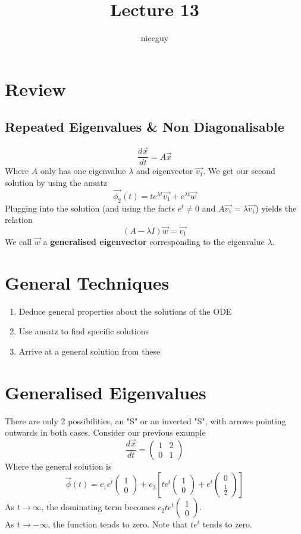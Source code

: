 \documentclass[12pt]{article}
\author{niceguy}
\title{Lecture 13}
\begin{document}
\maketitle

\section{Review}

\subsection{Repeated Eigenvalues \& Non Diagonalisable}

$$\frac{d\vec{x}}{dt} = A\vec{x}$$
Where $A$ only has one eigenvalue $\lambda$ and eigenvector $\vec{v_1}$. We get our second solution by using the ansatz
$$\vec{\phi_2}(t) = te^{\lambda t}\vec{v_1} + e^{\lambda t}\vec{w}$$
Plugging into the solution (and using the facts $e^t \neq 0$ and $A\vec{v_1} = \lambda\vec{v_1}$) yields the relation
$$(A-\lambda I)\vec{w} = \vec{v_1}$$
We call $\vec{w}$ a \textbf{generalised eigenvector} corresponding to the eigenvalue $\lambda$.

\section{General Techniques}
\begin{enumerate}
	\item Deduce general properties about the solutions of the ODE
	\item Use ansatz to find specific solutions
	\item Arrive at a general solution from these
\end{enumerate}

\section{Generalised Eigenvalues}
There are only 2 possibilities, an "S" or an inverted "S", with arrows pointing outwards in both cases. Consider our previous example
$$\frac{d\vec{x}}{dt} = \begin{pmatrix} 1 & 2 \\ 0 & 1\end{pmatrix}$$
Where the general solution is
$$\vec{\phi}(t) = c_1e^t\begin{pmatrix} 1 \\ 0\end{pmatrix} + c_2\left[te^t\begin{pmatrix} 1 \\ 0\end{pmatrix} + e^t\begin{pmatrix} 0 \\ \frac{1}{2}\end{pmatrix}\right]$$
As $t\rightarrow\infty$, the dominating term becomes $c_2te^t\begin{pmatrix}1 \\ 0\end{pmatrix}$. \\
As $t\rightarrow -\infty$, the function tends to zero. Note that $te^t$ tends to zero.
\end{document}
